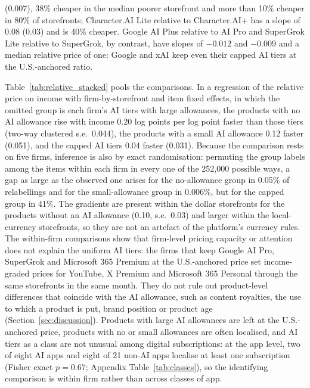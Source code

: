 \documentclass[11pt]{article}
\theoremstyle{definition}
\theoremstyle{remark}
\begin{document}
(0.007), 38\% cheaper in the median poorer storefront and more than 10\% cheaper in 80\% of storefronts; Character.AI Lite relative to Character.AI+ has a slope of 0.08 (0.03) and is 40\% cheaper. Google AI Plus relative to AI Pro and SuperGrok Lite relative to SuperGrok, by contrast, have slopes of $-0.012$ and $-0.009$ and a median relative price of one: Google and xAI keep even their capped AI tiers at the U.S.-anchored ratio.

Table~\ref{tab:relative_stacked} pools the comparisons. In a regression of the relative price on income with firm-by-storefront and item fixed effects, in which the omitted group is each firm's AI tiers with large allowances, the products with no AI allowance rise with income 0.20 log points per log point faster than those tiers (two-way clustered s.e.\ 0.044), the products with a small AI allowance 0.12 faster (0.051), and the capped AI tiers 0.04 faster (0.031). Because the comparison rests on five firms, inference is also by exact randomisation: permuting the group labels among the items within each firm in every one of the 252,000 possible ways, a gap as large as the observed one arises for the no-allowance group in 0.05\% of relabellings and for the small-allowance group in 0.006\%, but for the capped group in 41\%. The gradients are present within the dollar storefronts for the products without an AI allowance (0.10, s.e.\ 0.03) and larger within the local-currency storefronts, so they are not an artefact of the platform's currency rules. The within-firm comparisons show that firm-level pricing capacity or attention does not explain the uniform AI tiers: the firms that keep Google AI Pro, SuperGrok and Microsoft 365 Premium at the U.S.-anchored price set income-graded prices for YouTube, X Premium and Microsoft 365 Personal through the same storefronts in the same month. They do not rule out product-level differences that coincide with the AI allowance, such as content royalties, the use to which a product is put, brand position or product age (Section~\ref{sec:discussion}). Products with large AI allowances are left at the U.S.-anchored price, products with no or small allowances are often localised, and AI tiers as a class are not unusual among digital subscriptions: at the app level, two of eight AI apps and eight of 21 non-AI apps localise at least one subscription (Fisher exact $p=0.67$; Appendix Table~\ref{tab:classes}), so the identifying comparison is within firm rather than across classes of app.
\end{document}
